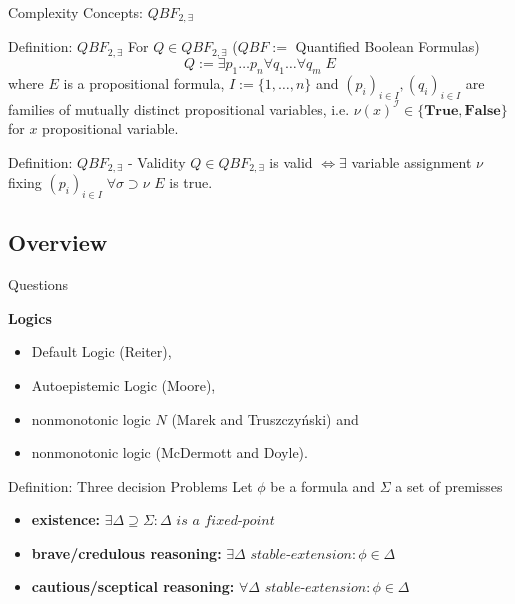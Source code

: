 \documentclass[usenames,dvipsnames, 8pt]{beamer}
\begin{document}
\begin{frame}{Complexity Concepts: $QBF_{2,\exists}$}

\begin{block}{Definition: $QBF_{2,\exists}$}
For $Q \in QBF_{2,\exists}$ ($QBF :=$ Quantified Boolean Formulas)
\begin{equation*}
Q := \exists p_1 \dots p_n \forall q_1 \dots \forall q_m \; E
\end{equation*}
where $E$ is a propositional formula, $I := \{1,\dots ,n\}$ and $(p_i)_{i \in I}, (q_i)_{i \in I}$ are families of mutually distinct propositional variables, i.e. $\nu(x)^{\mathcal{I}} \in \{\mathbf{True},\mathbf{False}\}$ for $x$ propositional variable.
\end{block}

\begin{block}{Definition: $QBF_{2,\exists}$ - Validity}
$Q \in QBF_{2,\exists}$ is valid $\iff \exists$ variable assignment $\nu$ fixing $(p_i)_{i \in I} \; \forall \sigma \supset \nu$ $E$ is true.
\end{block}
\end{frame}


\subsection{Overview}
\begin{frame}{Questions}

\textbf{Logics}
\begin{itemize}[label={-}]
\item<1-| alert@2> Default Logic (Reiter),
\item<1-| alert@2> Autoepistemic Logic (Moore),
\item<1-> nonmonotonic logic $N$ (Marek and Truszczy\'nski) and 
\item<1-> nonmonotonic logic (McDermott and Doyle). 
\end{itemize}

\begin{block}{Definition: Three  decision Problems}
Let $\phi$ be a formula and $\Sigma$ a set of premisses
\begin{itemize}
\item \textbf{existence:} $\exists \Delta \supseteq \Sigma : \Delta \textit{ is a fixed-point}$
\item \textbf{brave/credulous reasoning:} $\exists \Delta \textit{ stable-extension} : \phi \in \Delta$ 
\item \textbf{cautious/sceptical reasoning:} $\forall \Delta \textit{ stable-extension} : \phi \in \Delta$ 
\end{itemize}
\end{block}
\end{frame}
\end{document}
